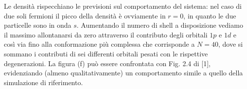 \documentclass[11pt,a4paper]{article}
\begin{document}
Le densità rispecchiano le previsioni sul comportamento del sistema: nel caso di due soli fermioni il picco della densità è ovviamente in $r=0$, in quanto le due particelle sono in onda $s$. Aumentando il numero di shell a disposizione vediamo il massimo allontanarsi da zero attraverso il contributo degli orbitali $1p$ e $1d$ e così via fino alla conformazione più complessa che corrisponde a $N=40$, dove si sommano i contributi di sei differenti orbitali pesati con le rispettive degenerazioni. La figura (f) può essere confrontata con Fig. 2.4 di [1], evidenziando (almeno qualitativamente) un comportamento simile a quello della simulazione di riferimento. 
\newpage
\begin{figure}[!h]
\centering
{}
\hspace{3mm}

\end{figure}
\end{document}
